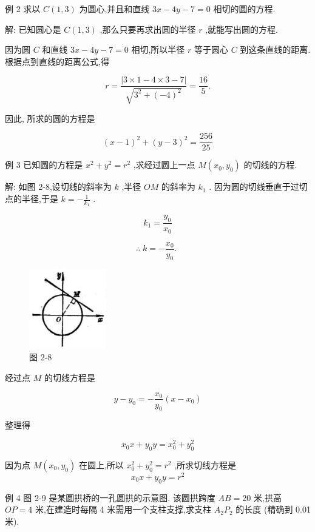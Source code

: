 \documentclass[lang=cn,newtx,10pt,scheme=chinese]{elegantbook}
\begin{document}
例 2 求以 \(C\left( {1,3}\right)\) 为圆心,并且和直线 \({3x} - {4y} - 7 = 0\) 相切的圆的方程.

解: 已知圆心是 \(C\left( {1,3}\right)\) ,那么只要再求出圆的半径 \(r\) ,就能写出圆的方程.

因为圆 \(C\) 和直线 \({3x} - {4y} - 7 = 0\) 相切,所以半径 \(r\) 等于圆心 \(C\) 到这条直线的距离. 根据点到直线的距离公式,得

\[
  r = \frac{\left| 3 \times 1 - 4 \times 3 - 7\right| }{\sqrt{{3}^{2} + {\left( -4\right) }^{2}}} = \frac{16}{5}.
\]

因此, 所求的圆的方程是

\[
    {\left( x - 1\right) }^{2} + {\left( y - 3\right) }^{2} = \frac{256}{25}
\]

例 3 已知圆的方程是 \({x}^{2} + {y}^{2} = {r}^{2}\) ,求经过圆上一点 \(M\left( {{x}_{0},{y}_{0}}\right)\) 的切线的方程.

解: 如图 2-8,设切线的斜率为 \(k\) ,半径 \({OM}\) 的斜率为 \({k}_{1}\) . 因为圆的切线垂直于过切点的半径,于是 \(k = - \frac{1}{{k}_{1}}\) .

\[
    {k}_{1} = \frac{{y}_{0}}{{x}_{0}}
\]

\[
  \therefore \;k = - \frac{{x}_{0}}{{y}_{0}}\text{. }
\]

\begin{figure}[h]
  \centering
  \includegraphics[max width=0.3\textwidth]{images/01912cc2-ffb6-728e-9ae7-b113ff05c64b_79_916236.jpg}
  \caption{图 2-8}
\end{figure}



经过点 \(M\) 的切线方程是

\[
  y - {y}_{0} = - \frac{{x}_{0}}{{y}_{0}}\left( {x - {x}_{0}}\right)
\]

整理得

\[
    {x}_{0}x + {y}_{0}y = {x}_{0}^{2} + {y}_{0}^{2}
\]
\begin{corollary}[切线方程]
	
因为点 \(M\left( {{x}_{0},{y}_{0}}\right)\) 在圆上,所以 \({x}_{0}^{2} + {y}_{0}^{2} = {r}^{2}\) ,所求切线方程是
\[
    {x}_{0}x + {y}_{0}y = {r}^{2}
\]
\end{corollary}
例 4 图 2-9 是某圆拱桥的一孔圆拱的示意图. 该圆拱跨度 \({AB} = {20}\) 米,拱高 \({OP} = 4\) 米,在建造时每隔 4 米需用一个支柱支撑,求支柱 \({A}_{2}{P}_{2}\) 的长度 (精确到 0.01 米).
\end{document}
